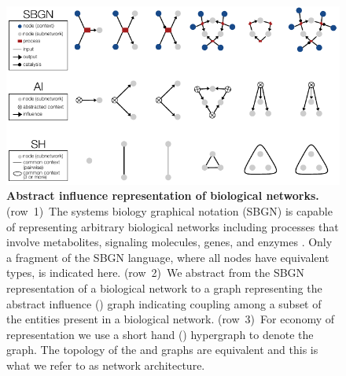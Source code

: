 \begin{figure}[!ht]
\centering
\noindent\includegraphics[width=0.9\columnwidth]{fig/netsubnetcontext.pdf}
\caption{{\bf Abstract influence representation of biological networks.} (row~1)~The systems biology graphical notation (SBGN) is capable of representing arbitrary biological networks including processes that involve metabolites, signaling molecules, genes, and enzymes \cite{LeNovere2009}. Only a fragment of the SBGN language, where all nodes have equivalent types, is indicated here. (row~2)~We abstract from the SBGN representation of a biological network to a graph representing the abstract influence (\AI{}) graph indicating coupling among a subset of the entities present in a biological network. (row~3)~For economy of representation we use a short hand (\SH{}) hypergraph to denote the \AI{} graph. The topology of the \AI{} and \SH{} graphs are equivalent and this is what we refer to as network architecture.}
\label{fig:netsubnetcontext}
\end{figure}

